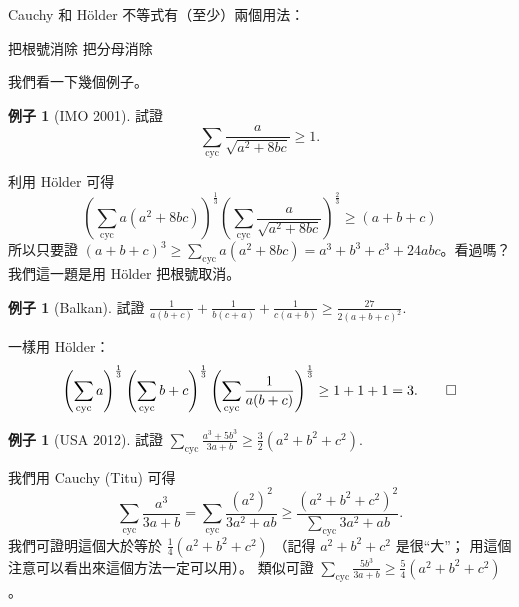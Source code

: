 \documentclass[11pt,nothm]{scrartcl}
\theoremstyle{definition}
\newtheorem{example}[theorem]{\color{blue!40!black}例子}
\let\oldendproof\endproof
\renewenvironment{proof}[1][【證】]{%
  \oldproof[\bfseries #1\nopunct]%
}{\oldendproof}
\begin{document}
Cauchy 和 H\"older 不等式有（至少）兩個用法：
\begin{enumerate}
  \ii 把根號消除
  \ii 把分母消除
\end{enumerate}

我們看一下幾個例子。
\begin{example}
  [IMO 2001] 試證 \[ \sum_{\text{cyc}} \frac{a}{\sqrt{a^2+8bc}} \ge 1. \]
\end{example}
\begin{proof}
  利用 H\"older 可得
  \[
    \left( \sum_{\text{cyc}} a(a^2+8bc) \right)^{\frac13}
    \left( \sum_{\text{cyc}} \frac{a}{\sqrt{a^2+8bc}} \right)^{\frac 23}
    \ge \left( a+b+c \right)
  \]
  所以只要證 $(a+b+c)^3 \ge \sum_{\text{cyc}} a(a^2+8bc) = a^3+b^3+c^3+24abc$。看過嗎？
\end{proof}
我們這一題是用 H\"older 把根號取消。


\begin{example}
  [Balkan] 試證 $\frac{1}{a(b+c)} + \frac{1}{b(c+a)} + \frac{1}{c(a+b)} \ge \frac{27}{2(a+b+c)^2}$.
\end{example}
\begin{proof}
  一樣用 H\"older：
  \[
    \left( \sum_{\text{cyc}} a \right)^{\frac 13}
    \left( \sum_{\text{cyc}} b+c \right)^{\frac 13}
    \left( \sum_{\text{cyc}} \frac{1}{a(b+c)} \right)^{\frac13}
    \ge 1+1+1
    = 3. \qedhere \]
\end{proof}


\begin{example}
  [USA 2012] 試證 $\sum_{\text{cyc}} \frac{a^3+5b^3}{3a+b} \ge \frac 32 \left( a^2+b^2+c^2 \right)$.
\end{example}
\begin{proof}
  我們用 Cauchy (Titu) 可得
  \[ \sum_{\text{cyc}} \frac{a^3}{3a+b}  = \sum_{\text{cyc}} \frac{(a^2)^2}{3a^2+ab} \ge \frac{(a^2+b^2+c^2)^2}{\sum_{\text{cyc}} 3a^2+ab}. \]
  我們可證明這個大於等於 $\frac14 (a^2+b^2+c^2)$
  （記得 $a^2+b^2+c^2$ 是很“大”；
  用這個注意可以看出來這個方法一定可以用）。
  類似可證 $\sum_{\text{cyc}} \frac{5b^3}{3a+b} \ge \frac 54 (a^2+b^2+c^2)$。
\end{proof}
\end{document}
